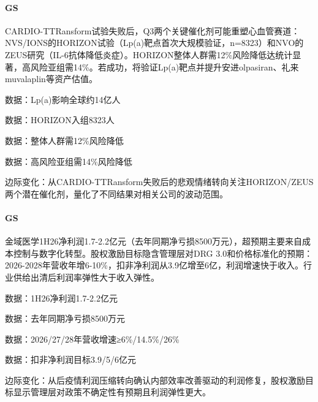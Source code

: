 \documentclass[11pt]{ctexart}
\begin{document}
\paragraph{GS} CARDIO-TTRansform试验失败后，Q3两个关键催化剂可能重塑心血管赛道：NVS/IONS的HORIZON试验（Lp(a)靶点首次大规模验证，n=8323）和NVO的ZEUS研究（IL-6抗体降低炎症）。HORIZON整体人群需12\%风险降低达统计显著，高风险亚组需14\%。若成功，将验证Lp(a)靶点并提升安进olpasiran、礼来muvalaplin等资产估值。
{\small\color{refgray}数据：Lp(a)影响全球约14亿人\par}
{\small\color{refgray}数据：HORIZON入组8323人\par}
{\small\color{refgray}数据：整体人群需12\%风险降低\par}
{\small\color{refgray}数据：高风险亚组需14\%风险降低\par}
{\small\color{refgray}边际变化：从CARDIO-TTRansform失败后的悲观情绪转向关注HORIZON/ZEUS两个潜在催化剂，量化了不同结果对相关公司的波动范围。\par}
\paragraph{GS} 金域医学1H26净利润1.7-2.2亿元（去年同期净亏损8500万元），超预期主要来自成本控制与数字化转型。股权激励目标隐含管理层对DRG 3.0和价格标准化的预期：2026-2028年营收年增6-10\%，扣非净利润从3.9亿增至6亿，利润增速快于收入。行业供给出清后利润率弹性大于收入弹性。
{\small\color{refgray}数据：1H26净利润1.7-2.2亿元\par}
{\small\color{refgray}数据：去年同期净亏损8500万元\par}
{\small\color{refgray}数据：2026/27/28年营收增速≥6\%/14.5\%/26\%\par}
{\small\color{refgray}数据：扣非净利润目标3.9/5/6亿元\par}
{\small\color{refgray}边际变化：从后疫情利润压缩转向确认内部效率改善驱动的利润修复，股权激励目标显示管理层对政策不确定性有预期且利润弹性更大。\par}
\end{document}
